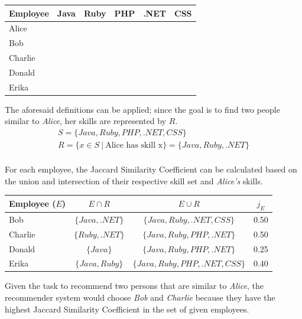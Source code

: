 \begin{center}
\begin{tabular}{l||c|c|c|c|c}
	Employee & Java & Ruby & PHP & .NET & CSS \\
	\hline
	Alice    & \checkmark & \checkmark &            & \checkmark &            \\
	Bob      & \checkmark &            &            & \checkmark & \checkmark \\
	Charlie  &            & \checkmark & \checkmark & \checkmark &            \\
	Donald   & \checkmark &            & \checkmark &            &            \\
	Erika    & \checkmark & \checkmark & \checkmark &            & \checkmark \\
\end{tabular}
\end{center}

The aforesaid definitions can be applied; since the goal is to find two people similar to \textit{Alice}, her skills are represented by $R$.
\begin{gather*}
	S = \{Java, Ruby, PHP, .NET, CSS\} \\
	R = \{x \in S \ | \ \textrm{Alice has skill x}\} = \{ Java, Ruby, .NET \}\\
\end{gather*}

For each employee, the Jaccard Similarity Coefficient can be calculated based on the union and intersection of their respective skill set and \textit{Alice's} skills.
\begin{center}
\begin{tabular}{l||c|c||c}
	Employee ($E$) & $E \cap R$ & $E \cup R$ & $j_E$ \\
	\hline
	Bob            & $\{Java, .NET\}$ & $\{Java, Ruby, .NET, CSS\}$ & 0.50 \\
	Charlie        & $\{Ruby, .NET\}$ & $\{Java, Ruby, PHP, .NET\}$ & 0.50 \\
	Donald         & $\{Java\}$ & $\{Java, Ruby, PHP, .NET\}$ & 0.25\\
	Erika          & $\{Java, Ruby\}$ & $\{Java, Ruby, PHP, .NET, CSS\}$ & 0.40\\
\end{tabular}
\end{center}

Given the task to recommend two persons that are similar to \textit{Alice}, the recommender system would choose \textit{Bob} and \textit{Charlie} because they have the highest Jaccard Similarity Coefficient in the set of given employees.

